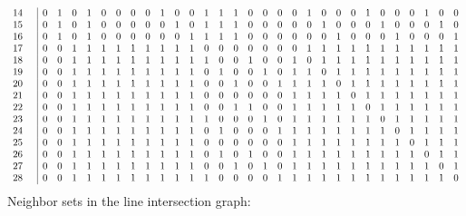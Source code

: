 \documentclass{article}
\begin{document}
{{$$\begin{array}{rr|*{29}r}
14 &  & 0 & 1 & 0 & 1 & 0 & 0 & 0 & 0 & 1 & 0 & 0 & 1 & 1 & 1 & 0 & 0 & 0 & 0 & 1 & 0 & 0 & 0 & 1 & 0 & 0 & 0 & 1 & 0 & 0\\
15 &  & 0 & 1 & 0 & 1 & 0 & 0 & 0 & 0 & 0 & 1 & 0 & 1 & 1 & 1 & 0 & 0 & 0 & 0 & 0 & 1 & 0 & 0 & 0 & 1 & 0 & 0 & 0 & 1 & 0\\
16 &  & 0 & 1 & 0 & 1 & 0 & 0 & 0 & 0 & 0 & 0 & 1 & 1 & 1 & 1 & 0 & 0 & 0 & 0 & 0 & 0 & 1 & 0 & 0 & 0 & 1 & 0 & 0 & 0 & 1\\
17 &  & 0 & 0 & 1 & 1 & 1 & 1 & 1 & 1 & 1 & 1 & 1 & 0 & 0 & 0 & 0 & 0 & 0 & 0 & 1 & 1 & 1 & 1 & 1 & 1 & 1 & 1 & 1 & 1 & 1\\
18 &  & 0 & 0 & 1 & 1 & 1 & 1 & 1 & 1 & 1 & 1 & 1 & 1 & 0 & 0 & 1 & 0 & 0 & 1 & 0 & 1 & 1 & 1 & 1 & 1 & 1 & 1 & 1 & 1 & 1\\
19 &  & 0 & 0 & 1 & 1 & 1 & 1 & 1 & 1 & 1 & 1 & 1 & 0 & 1 & 0 & 0 & 1 & 0 & 1 & 1 & 0 & 1 & 1 & 1 & 1 & 1 & 1 & 1 & 1 & 1\\
20 &  & 0 & 0 & 1 & 1 & 1 & 1 & 1 & 1 & 1 & 1 & 1 & 0 & 0 & 1 & 0 & 0 & 1 & 1 & 1 & 1 & 0 & 1 & 1 & 1 & 1 & 1 & 1 & 1 & 1\\
21 &  & 0 & 0 & 1 & 1 & 1 & 1 & 1 & 1 & 1 & 1 & 1 & 0 & 0 & 0 & 0 & 0 & 0 & 1 & 1 & 1 & 1 & 0 & 1 & 1 & 1 & 1 & 1 & 1 & 1\\
22 &  & 0 & 0 & 1 & 1 & 1 & 1 & 1 & 1 & 1 & 1 & 1 & 0 & 0 & 1 & 1 & 0 & 0 & 1 & 1 & 1 & 1 & 1 & 0 & 1 & 1 & 1 & 1 & 1 & 1\\
23 &  & 0 & 0 & 1 & 1 & 1 & 1 & 1 & 1 & 1 & 1 & 1 & 1 & 0 & 0 & 0 & 1 & 0 & 1 & 1 & 1 & 1 & 1 & 1 & 0 & 1 & 1 & 1 & 1 & 1\\
24 &  & 0 & 0 & 1 & 1 & 1 & 1 & 1 & 1 & 1 & 1 & 1 & 0 & 1 & 0 & 0 & 0 & 1 & 1 & 1 & 1 & 1 & 1 & 1 & 1 & 0 & 1 & 1 & 1 & 1\\
25 &  & 0 & 0 & 1 & 1 & 1 & 1 & 1 & 1 & 1 & 1 & 1 & 0 & 0 & 0 & 0 & 0 & 0 & 1 & 1 & 1 & 1 & 1 & 1 & 1 & 1 & 0 & 1 & 1 & 1\\
26 &  & 0 & 0 & 1 & 1 & 1 & 1 & 1 & 1 & 1 & 1 & 1 & 0 & 1 & 0 & 1 & 0 & 0 & 1 & 1 & 1 & 1 & 1 & 1 & 1 & 1 & 1 & 0 & 1 & 1\\
27 &  & 0 & 0 & 1 & 1 & 1 & 1 & 1 & 1 & 1 & 1 & 1 & 0 & 0 & 1 & 0 & 1 & 0 & 1 & 1 & 1 & 1 & 1 & 1 & 1 & 1 & 1 & 1 & 0 & 1\\
28 &  & 0 & 0 & 1 & 1 & 1 & 1 & 1 & 1 & 1 & 1 & 1 & 1 & 0 & 0 & 0 & 0 & 1 & 1 & 1 & 1 & 1 & 1 & 1 & 1 & 1 & 1 & 1 & 1 & 0\\
\end{array}
$$
}%
Neighbor sets in the line intersection graph:\\
}
\end{document}
